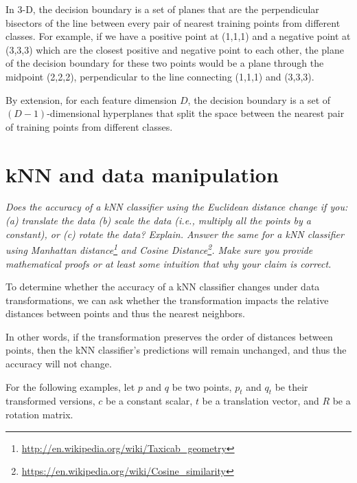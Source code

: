 \documentclass[fleqn]{article}
\begin{document}
In 3-D, the decision boundary is a set of planes that are the perpendicular bisectors of the line between every pair of nearest training points from different classes.
For example, if we have a positive point at (1,1,1) and a negative point at (3,3,3) which are the closest positive and negative point to each other,
the plane of the decision boundary for these two points would be a plane through the midpoint (2,2,2), perpendicular to the line connecting (1,1,1) and (3,3,3).

By extension, for each feature dimension $D$, the decision boundary is a set of $(D-1)$-dimensional hyperplanes that split the space between the nearest pair of training points from different classes.

\section{kNN and data manipulation}
\textit{Does the accuracy of a kNN classifier using the Euclidean distance change if you:(a) translate the data (b) scale the data (i.e., multiply all the points by a constant), or (c) rotate the data? Explain. Answer the same for a kNN classifier using Manhattan distance\footnote{\url{http://en.wikipedia.org/wiki/Taxicab_geometry}} and Cosine Distance\footnote{\url{https://en.wikipedia.org/wiki/Cosine_similarity}}. Make sure you provide mathematical proofs or at least some intuition that why your claim is correct.}

To determine whether the accuracy of a kNN classifier changes under data transformations,
we can ask whether the transformation impacts the relative distances between points and thus the nearest neighbors.

In other words, if the transformation preserves the order of distances between points,
then the kNN classifier's predictions will remain unchanged, and thus the accuracy will not change.

For the following examples, let $p$ and $q$ be two points, $p_t$ and $q_t$ be their transformed versions, $c$ be a constant scalar, $t$ be a translation vector, and $R$ be a rotation matrix.
\end{document}
